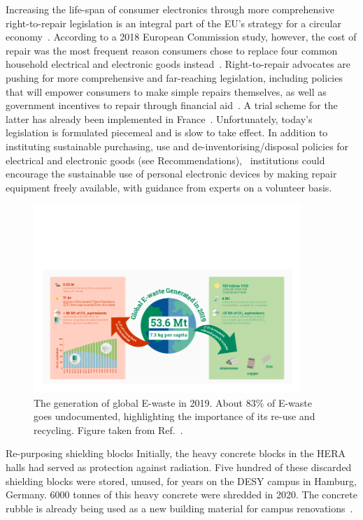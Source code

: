 \documentclass[../SustainableHEP.tex]{subfiles}
\begin{document}
Increasing the life-span of consumer electronics through more comprehensive right-to-repair 
legislation is an integral part of the EU's strategy for a circular economy~\cite{EUNews,EUR2RSummary}.  According to a 2018 European Commission study, however, the cost of repair was the most frequent reason consumers chose to replace four common household electrical and electronic goods instead~\cite{ECConsumerStudy}. 
Right-to-repair advocates are pushing for more comprehensive and far-reaching legislation, including policies that will empower consumers to make simple repairs themselves, as well as government incentives to repair through \eg financial aid~\cite{R2RPolicy}. A trial scheme for the latter has already been implemented in France~\cite{FrenchRepairAid}.  Unfortunately, today's legislation is formulated piecemeal and is slow to take effect.  In addition to instituting sustainable purchasing, use and de-inventorising/disposal policies for electrical and electronic goods (see Recommendations), \ACR\ institutions could encourage the sustainable use of personal electronic devices by making repair equipment freely available, with guidance from experts on a volunteer basis.

\begin{figure}
    \centering
    \includegraphics[width=0.9\textwidth]{Sections/Figs/Waste/EWaste-1.png}
    \caption{The generation of global E-waste in 2019. About 83\% of E-waste goes undocumented, highlighting the importance of its re-use and recycling. Figure taken from Ref.~\cite{EWaste}.\label{fig:ewaste}}
\end{figure}


\begin{bestpractice}{Re-purposing shielding blocks}%
\noindent Initially, the heavy concrete blocks in the HERA halls had served
as protection against radiation. Five hundred of these discarded shielding blocks were stored, unused,  for years on the DESY campus in Hamburg, Germany. 6000 tonnes of this heavy concrete were shredded in 2020. The concrete rubble is already being used as a new building material for campus renovations~\cite{DESYsustainableReport2022}.
\end{bestpractice}
\end{document}

